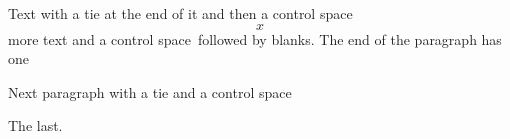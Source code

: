 \documentclass{article}
\begin{document}
Text with a tie at the end of it and then a control space~\ 
\begin{displaymath} x \end{displaymath}
more text and a control space\  
followed by blanks. The end of the paragraph has one\ 

Next paragraph with a tie and a control space~\ 

The last.
\end{document}
